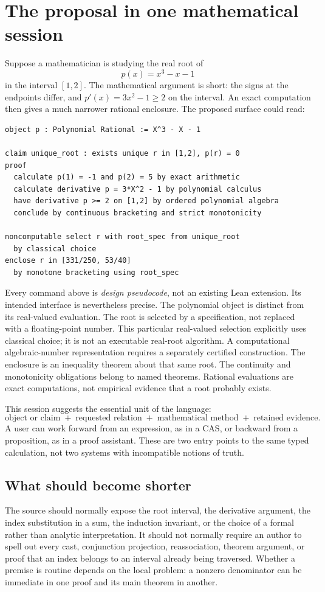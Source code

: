 \documentclass[11pt,a4paper]{article}
\theoremstyle{remark}\newtheorem{example}[proposition]{Example}
\begin{document}
\section{The proposal in one mathematical session}\label{sec:session}
Suppose a mathematician is studying the real root of
\[
 p(x)=x^3-x-1
\]
in the interval $[1,2]$. The mathematical argument is short: the signs at the endpoints differ, and $p'(x)=3x^2-1\geq2$ on the interval. An exact computation then gives a much narrower rational enclosure. The proposed surface could read:
\begin{lstlisting}
object p : Polynomial Rational := X^3 - X - 1

claim unique_root : exists unique r in [1,2], p(r) = 0
proof
  calculate p(1) = -1 and p(2) = 5 by exact arithmetic
  calculate derivative p = 3*X^2 - 1 by polynomial calculus
  have derivative p >= 2 on [1,2] by ordered polynomial algebra
  conclude by continuous bracketing and strict monotonicity

noncomputable select r with root_spec from unique_root
  by classical choice
enclose r in [331/250, 53/40]
  by monotone bracketing using root_spec
\end{lstlisting}
Every command above is \emph{design pseudocode}, not an existing Lean extension. Its intended interface is nevertheless precise. The polynomial object is distinct from its real-valued evaluation. The root is selected by a specification, not replaced with a floating-point number. This particular real-valued selection explicitly uses classical choice; it is not an executable real-root algorithm. A computational algebraic-number representation requires a separately certified construction. The enclosure is an inequality theorem about that same root. The continuity and monotonicity obligations belong to named theorems. Rational evaluations are exact computations, not empirical evidence that a root probably exists.

This session suggests the essential unit of the language:
\[
 \boxed{\text{object or claim}\; +\;\text{requested relation}\; +\;
        \text{mathematical method}\; +\;\text{retained evidence}.}
\]
A user can work forward from an expression, as in a CAS, or backward from a proposition, as in a proof assistant. These are two entry points to the same typed calculation, not two systems with incompatible notions of truth.

\subsection{What should become shorter}
The source should normally expose the root interval, the derivative argument, the index substitution in a sum, the induction invariant, or the choice of a formal rather than analytic interpretation. It should not normally require an author to spell out every cast, conjunction projection, reassociation, theorem argument, or proof that an index belongs to an interval already being traversed. Whether a premise is routine depends on the local problem: a nonzero denominator can be immediate in one proof and its main theorem in another.
\end{document}
